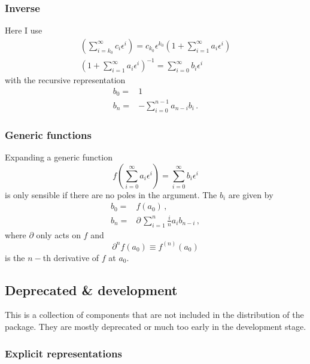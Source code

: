 \documentclass{article}
\begin{document}
\subsubsection{Inverse}
\label{sec:impl_inverse}

Here I use
\begin{align}
  \label{eq:inv}
  \left(\sum_{i=k_0}^{\infty}c_i
    \epsilon^i\right)=c_{k_0}\epsilon^{k_0}\left(1+\sum_{i=1}^{\infty}a_i
    \epsilon^i\right)\\
\left(1+\sum_{i=1}^{\infty}a_i \epsilon^i\right)^{-1}=\sum_{i=0}^{\infty}b_i \epsilon^i
\end{align}
with the recursive representation
\begin{align}
  \label{eq:inv_rec}
  b_0=&1\\
  b_n=&-\sum_{i=0}^{n-1} a_{n-i}b_i \,.
\end{align}

\subsubsection{Generic functions}
\label{sec:generic_fun}

Expanding a generic function
\begin{equation}
  \label{eq:generic_fun}
  f\left(\sum_{i=0}^{\infty}a_i
    \epsilon^i\right)=\sum_{i=0}^{\infty}b_i
    \epsilon^i
\end{equation}
is only sensible if there are no poles in the argument.
The $b_i$ are given by
\begin{align}
  \label{eq:generic_rec}
  b_0=&f(a_0)\,,\\
  b_n=&\partial\,\sum_{i=1}^{n}\frac{i}{n} a_{i}b_{n-i} \,,
\end{align}
where $\partial$ only acts on $f$ and
\begin{equation}
  \label{eq:partial}
  \partial^n f(a_0) \equiv f^{(n)}(a_0) 
\end{equation}
is the $n-$th derivative of $f$ at $a_0$. 

\subsection{Deprecated \& development}
\label{sec:depr}

This is a collection of components that are not included in the
distribution of the package. They are mostly deprecated or much too
early in the development stage.

\subsubsection{Explicit representations}
\end{document}
